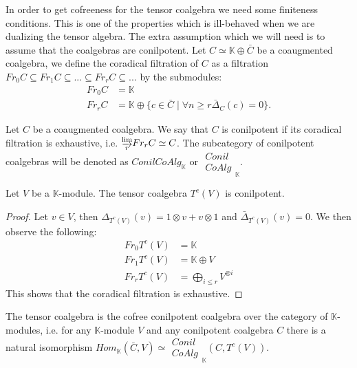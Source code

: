 \documentclass[../thesis.tex]{subfiles}
\begin{document}
            In order to get cofreeness for the tensor coalgebra we need some finiteness conditions. This is one of the properties which is ill-behaved when we are dualizing the tensor algebra. The extra assumption which we will need is to assume that the coalgebras are conilpotent. Let $C \simeq \mathbb{K} \oplus \bar{C}$ be a coaugmented coalgebra, we define the coradical filtration of $C$ as a filtration $Fr_0C \subseteq Fr_1C \subseteq ... \subseteq Fr_rC \subseteq ...$ by the submodules:
            \begin{align*}
                Fr_0C & = \mathbb{K} \\
                Fr_rC & = \mathbb{K} \oplus \{c\in\bar{C}\mid \forall n\geq r \bar{\Delta}_C(c) = 0\}.
            \end{align*}

            \begin{definition}
                Let $C$ be a coaugmented coalgebra. We say that $C$ is conilpotent if its coradical filtration is exhaustive, i.e. $\substack{\varinjlim \\ r}Fr_rC \simeq C$. The subcategory of conilpotent coalgebras will be denoted as $ConilCoAlg_\mathbb{K}$ or $\substack{Conil \\ CoAlg}_{\mathbb{K}}$.
            \end{definition}
            
            \begin{proposition}\label{prop: conilpotent-tensor}
                Let $V$ be a $\mathbb{K}$-module. The tensor coalgebra $T^c(V)$ is conilpotent.
            \end{proposition}

            \begin{proof}
                Let $v\in V$, then $\Delta_{T^c(V)}(v)=1\otimes v + v\otimes 1$ and $\bar{\Delta}_{T^c(V)}(v)=0$. We then observe the following:
                \begin{align*}
                    Fr_0T^c(V) & = \mathbb{K} \\
                    Fr_1T^c(V) & = \mathbb{K} \oplus V \\
                    Fr_rT^c(V) & = \bigoplus_{i\leq r} V^{\otimes i}
                \end{align*}
                This shows that the coradical filtration is exhaustive.
            \end{proof}

            \begin{proposition}\label{prop: cofree-tensor}
                The tensor coalgebra is the cofree conilpotent coalgebra over the category of $\mathbb{K}$-modules, i.e. for any $\mathbb{K}$-module $V$ and any conilpotent coalgebra $C$ there is a natural isomorphism $Hom_{\mathbb{K}}(\bar{C}, V)\simeq \substack{Conil \\ CoAlg}_{\mathbb{K}}(C, T^c(V))$.
            \end{proposition}
\end{document}
